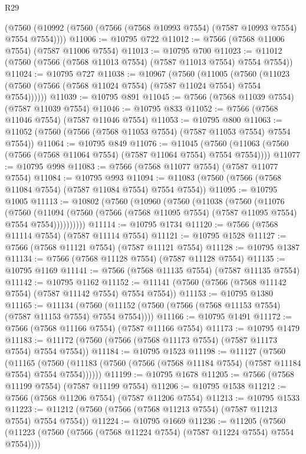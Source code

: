 \begin{lexlean}{R29}
\begin{coremodule}
    (@7560 (@10992 (@7560 (@7566 (@7568 @10993 @7554) (@7587 @10993 @7554) @7554 @7554))))
@11006 := @10795 @722
@11012 := @7566 (@7568 @11006 @7554) (@7587 @11006 @7554)
@11013 := @10795 @700
@11023 := @11012 (@7560 (@7566 (@7568 @11013 @7554) (@7587 @11013 @7554) @7554 @7554))
@11024 := @10795 @727
@11038 := @10967
    (@7560
      (@11005
        (@7560 (@11023 (@7560 (@7566 (@7568 @11024 @7554) (@7587 @11024 @7554) @7554 @7554))))))
@11039 := @10795 @891
@11045 := @7566 (@7568 @11039 @7554) (@7587 @11039 @7554)
@11046 := @10795 @833
@11052 := @7566 (@7568 @11046 @7554) (@7587 @11046 @7554)
@11053 := @10795 @800
@11063 := @11052 (@7560 (@7566 (@7568 @11053 @7554) (@7587 @11053 @7554) @7554 @7554))
@11064 := @10795 @849
@11076 := @11045
    (@7560 (@11063 (@7560 (@7566 (@7568 @11064 @7554) (@7587 @11064 @7554) @7554 @7554))))
@11077 := @10795 @998
@11083 := @7566 (@7568 @11077 @7554) (@7587 @11077 @7554)
@11084 := @10795 @993
@11094 := @11083 (@7560 (@7566 (@7568 @11084 @7554) (@7587 @11084 @7554) @7554 @7554))
@11095 := @10795 @1005
@11113 := @10802
    (@7560
      (@10960
        (@7560
          (@11038
            (@7560
              (@11076
                (@7560
                  (@11094
                    (@7560 (@7566 (@7568 @11095 @7554) (@7587 @11095 @7554) @7554 @7554))))))))))
@11114 := @10795 @1734
@11120 := @7566 (@7568 @11114 @7554) (@7587 @11114 @7554)
@11121 := @10795 @1528
@11127 := @7566 (@7568 @11121 @7554) (@7587 @11121 @7554)
@11128 := @10795 @1387
@11134 := @7566 (@7568 @11128 @7554) (@7587 @11128 @7554)
@11135 := @10795 @1169
@11141 := @7566 (@7568 @11135 @7554) (@7587 @11135 @7554)
@11142 := @10795 @1162
@11152 := @11141 (@7560 (@7566 (@7568 @11142 @7554) (@7587 @11142 @7554) @7554 @7554))
@11153 := @10795 @1380
@11165 := @11134
    (@7560 (@11152 (@7560 (@7566 (@7568 @11153 @7554) (@7587 @11153 @7554) @7554 @7554))))
@11166 := @10795 @1491
@11172 := @7566 (@7568 @11166 @7554) (@7587 @11166 @7554)
@11173 := @10795 @1479
@11183 := @11172 (@7560 (@7566 (@7568 @11173 @7554) (@7587 @11173 @7554) @7554 @7554))
@11184 := @10795 @1523
@11198 := @11127
    (@7560
      (@11165
        (@7560 (@11183 (@7560 (@7566 (@7568 @11184 @7554) (@7587 @11184 @7554) @7554 @7554))))))
@11199 := @10795 @1678
@11205 := @7566 (@7568 @11199 @7554) (@7587 @11199 @7554)
@11206 := @10795 @1538
@11212 := @7566 (@7568 @11206 @7554) (@7587 @11206 @7554)
@11213 := @10795 @1533
@11223 := @11212 (@7560 (@7566 (@7568 @11213 @7554) (@7587 @11213 @7554) @7554 @7554))
@11224 := @10795 @1669
@11236 := @11205
    (@7560 (@11223 (@7560 (@7566 (@7568 @11224 @7554) (@7587 @11224 @7554) @7554 @7554))))

\end{coremodule}
\end{lexlean}
